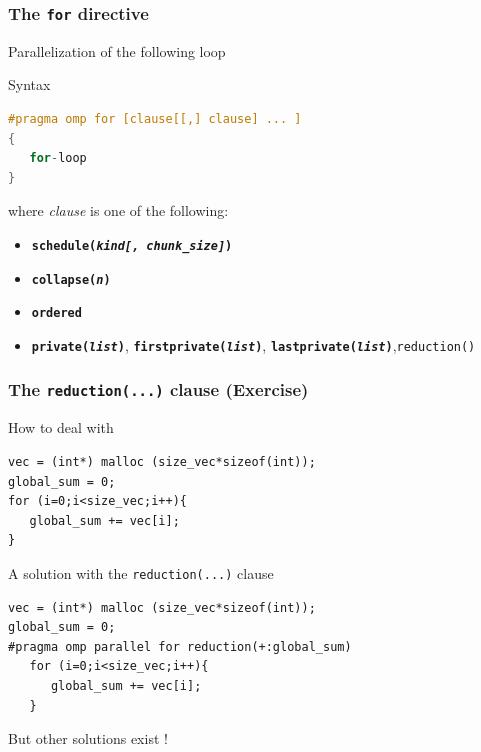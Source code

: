\begin{frame}[containsverbatim]
\frametitle{The \texttt{for} directive}

\begin{block}{}
Parallelization of the following loop
\end{block}

\begin{exampleblock}{Syntax}
\begin{lstlisting}[language=C,frame=lines]
#pragma omp for [clause[[,] clause] ... ]
{
   for-loop
}
\end{lstlisting}
where \textit{clause} is one of the following:
\begin{itemize}
\item{\textbf{\texttt{schedule(\textit{kind[, chunk\_size]})}}}
\item{\textbf{\texttt{collapse(\textit{n})}}}
\item{\textbf{\texttt{ordered}}}
\item{\textbf{\texttt{private(\textit{list})}}, \textbf{\texttt{firstprivate(\textit{list})}}, \textbf{\texttt{lastprivate(\textit{list})}},\texttt{reduction()} }
\end{itemize}
\end{exampleblock}
\end{frame}


\begin{frame}[containsverbatim]
\frametitle{The \texttt{reduction(...)} clause (Exercise)}
\begin{block}{How to deal with}
\vspace{-.5cm}
\begin{verbatim}
vec = (int*) malloc (size_vec*sizeof(int));
global_sum = 0;
for (i=0;i<size_vec;i++){
   global_sum += vec[i];
}
\end{verbatim}
\end{block}

\vspace{-.5cm}
\begin{block}{A solution with the \texttt{reduction(...)} clause}
\vspace{-.5cm}

\begin{verbatim}
vec = (int*) malloc (size_vec*sizeof(int));
global_sum = 0;
#pragma omp parallel for reduction(+:global_sum)
   for (i=0;i<size_vec;i++){
      global_sum += vec[i];
   }
\end{verbatim}
But other solutions exist !
\end{block}
\end{frame}


